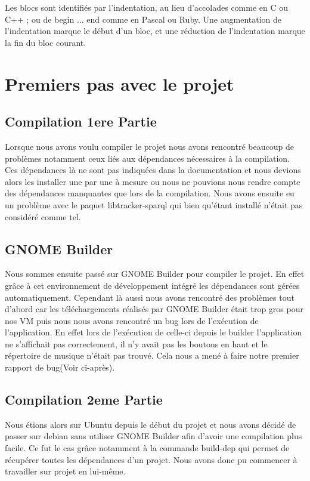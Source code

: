 \documentclass[12pt]{report}
\begin{document}
Les blocs sont identifiés par l'indentation, au lieu d'accolades 
comme en C ou C++ ; ou de begin ... end comme en Pascal ou Ruby. 
Une augmentation de l'indentation marque le début d'un bloc, et 
une réduction de l'indentation marque la fin du bloc courant. 

\section{Premiers pas avec le projet}
\subsection{Compilation 1ere Partie}
Lorsque nous avons voulu compiler le projet nous avons rencontré 
beaucoup de problèmes notamment ceux liés aux dépendances nécessaires
à la compilation. Ces dépendances là ne sont pas indiquées dans la
documentation et nous devions alors les installer une par une à
mesure ou nous ne pouvions nous rendre compte des dépendances 
manquantes que lors de la compilation. 
Nous avons ensuite eu un problème avec le paquet libtracker-sparql
qui bien qu'étant installé n’était pas considéré comme tel.

\subsection{GNOME Builder}
Nous sommes ensuite passé sur GNOME Builder pour compiler le projet.
En effet grâce à cet environnement de développement intégré les 
dépendances sont gérées automatiquement. Cependant là aussi nous
avons rencontré des problèmes tout d'abord car les téléchargements
réalisés par GNOME Builder était trop gros pour nos VM puis nous 
nous avons rencontré un bug lors de l’exécution de l'application.
En effet lors de l'exécution de celle-ci depuis le builder l'application
ne s'affichait pas correctement, il n'y avait pas les boutons en haut
et le répertoire de musique n’était pas trouvé. Cela nous a mené à 
faire notre premier rapport de bug(Voir ci-après).

\subsection{Compilation 2eme Partie}
Nous étions alors sur Ubuntu depuis le début du projet et nous avons
décidé de passer sur debian sans utiliser GNOME Builder afin d'avoir 
une compilation plus facile. Ce fut le cas grâce notamment à la 
commande build-dep qui permet de récupérer toutes les dépendances d'un 
projet. Nous avons donc pu commencer à travailler sur projet en 
lui-même.
\end{document}

